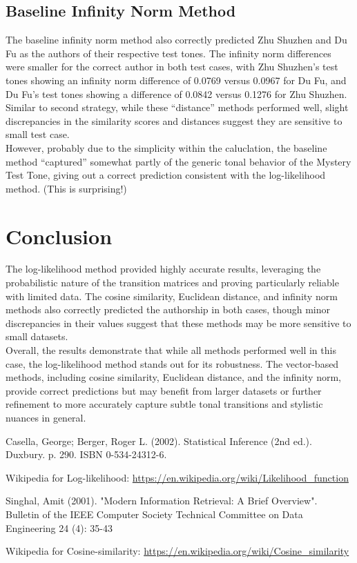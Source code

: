 \documentclass[12pt]{article}
\begin{document}
\subsection*{Baseline Infinity Norm Method}
The baseline infinity norm method also correctly predicted Zhu Shuzhen and Du Fu as the authors of their respective test tones. The infinity norm differences were smaller for the correct author in both test cases, with Zhu Shuzhen's test tones showing an infinity norm difference of 0.0769 versus 0.0967 for Du Fu, and Du Fu's test tones showing a difference of 0.0842 versus 0.1276 for Zhu Shuzhen.
\\
Similar to second strategy, while these ``distance'' methods performed well, slight discrepancies in the similarity scores and distances suggest they are sensitive to small test case.
\\
However, probably due to the simplicity within the caluclation, the baseline method ``captured'' somewhat partly of the generic tonal behavior of the Mystery Test Tone, giving out a correct prediction consistent with the log-likelihood method. (This is surprising!) 

\section{Conclusion}
The log-likelihood method provided highly accurate results, leveraging the probabilistic nature of the transition matrices and proving particularly reliable with limited data. The cosine similarity, Euclidean distance, and infinity norm methods also correctly predicted the authorship in both cases, though minor discrepancies in their values suggest that these methods may be more sensitive to small datasets.
\\
Overall, the results demonstrate that while all methods performed well in this case, the log-likelihood method stands out for its robustness. The vector-based methods, including cosine similarity, Euclidean distance, and the infinity norm, provide correct predictions but may benefit from larger datasets or further refinement to more accurately capture subtle tonal transitions and stylistic nuances in general.

\begin{thebibliography}{99}

     Casella, George; Berger, Roger L. (2002). Statistical Inference (2nd ed.). Duxbury. p. 290. ISBN 0-534-24312-6.

     Wikipedia for Log-likelihood: \url{https://en.wikipedia.org/wiki/Likelihood_function}

     Singhal, Amit (2001). "Modern Information Retrieval: A Brief Overview". Bulletin of the IEEE Computer Society Technical Committee on Data Engineering 24 (4): 35-43

     Wikipedia for Cosine-similarity: \url{https://en.wikipedia.org/wiki/Cosine_similarity}

    
\end{thebibliography}
\end{document}
